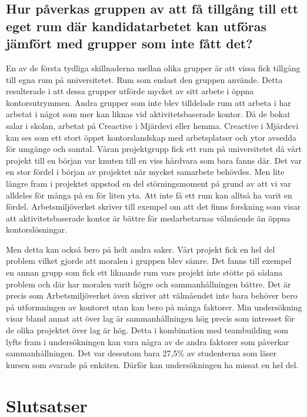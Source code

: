 \subsection{Hur påverkas gruppen av att få tillgång till ett eget rum där kandidatarbetet kan utföras jämfört med grupper som inte fått det?}
En av de första tydliga skillnaderna mellan olika grupper är att vissa fick tillgång till egna rum på universitetet. Rum som endast den gruppen använde. Detta resulterade i att dessa grupper utförde mycket av sitt arbete i öppna kontorsutrymmen. Andra grupper som inte blev tilldelade rum att arbeta i har arbetat i något som mer kan liknas vid aktivitetsbaserade kontor. Då de bokat salar i skolan, arbetat på Creactive i Mjärdevi eller hemma. Creactive i Mjärdevi kan ses som ett stort öppet kontorslandskap med arbetsplatser och ytor avsedda för umgänge och samtal. Våran projektgrupp fick ett rum på universitetet då vårt projekt till en början var knuten till en viss hårdvara som bara fanns där. Det var en stor fördel i början av projektet när mycket samarbete behövdes. Men lite längre fram i projektet uppstod en del störningsmoment på grund av att vi var alldeles för många på en för liten yta. Att inte få ett rum kan alltså ha varit en fördel. Arbetsmiljöverket skriver till exempel om att det finns forskning som visar att aktivitetsbaserade kontor är bättre för medarbetarnas välmående än öppna kontorslösningar. 

Men detta kan också bero på helt andra saker. Vårt projekt fick en hel del problem vilket gjorde att moralen i gruppen blev sämre. Det fanns till exempel en annan grupp som fick ett liknande rum vars projekt inte stötte på sådana problem och där har moralen varit högre och sammanhållningen bättre. Det är precis som Arbetsmiljöverket även skriver att välmåendet inte bara behöver bero på utformningen av kontoret utan kan bero på många faktorer. Min undersökning visar bland annat att över lag är sammanhållningen hög precis som intresset för de olika projektet över lag är hög. Detta i kombination med teambuilding som lyfts fram i undersökningen kan vara några av de andra faktorer som påverkar sammanhållningen. Det var dessutom bara 27,5\% av studenterna som läser kursen som svarade på enkäten. Därför kan undersökningen ha missat en hel del.

\section{Slutsatser}
\label{sec:conclusions-hampus}


